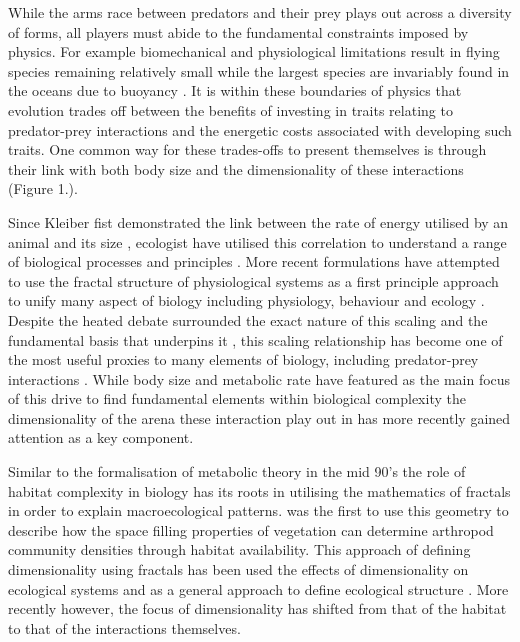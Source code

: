While the arms race between predators and their prey plays out across a diversity of forms, all players must abide to the fundamental constraints imposed by physics. For example biomechanical and physiological limitations result in flying species remaining relatively small \citep{chatterjee2007aerodynamics,dudley2002mechanisms} while the largest species are invariably found in the oceans due to buoyancy \citep{heim2015cope}. It is within these boundaries of physics that evolution trades off between the benefits of investing in traits relating to predator-prey interactions and the energetic costs associated with developing such traits. One common way for these trades-offs to present themselves is through their link with both body size and the dimensionality of these interactions (Figure 1.).

Since Kleiber fist demonstrated the link between the rate of energy utilised by an animal and its size \citep{kleiber1947body}, ecologist have utilised this correlation to understand a range of biological processes and principles \citep{sibly2012metabolic,west1997general,brown2004}. More recent formulations have attempted to use the fractal structure of physiological systems as a first principle approach to unify many aspect of biology including physiology, behaviour and ecology \citep{west1997general,brown2004}. Despite the heated debate surrounded the exact nature of this scaling and the fundamental basis that underpins it \citep{isaac2010metabolic}, this scaling relationship has become one of the most useful proxies to many elements of biology, including predator-prey interactions \citep{brown2004}. While body size and metabolic rate have featured as the main focus of this drive to find fundamental elements within biological complexity the dimensionality of the arena these interaction play out in has more recently gained attention as a key component.


Similar to the formalisation of metabolic theory in the mid 90's the role of habitat complexity in biology has its roots in utilising the mathematics of fractals in order to explain macroecological patterns. \cite{morse1985fractal} was the first to use this geometry to describe how the space filling properties of vegetation can determine arthropod community densities through habitat availability. This approach of defining dimensionality using fractals has been used the effects of dimensionality on ecological systems \citep{kenkel1996fractals,shorrocks1991fractal,gunnarsson1992fractal,gee1994body,jeffries1993invertebrate} and as a general approach to define ecological structure \citep{cohen1995marine,henderson2010linking}. More recently however, the focus of dimensionality has shifted from that of the habitat to that of the interactions themselves.


